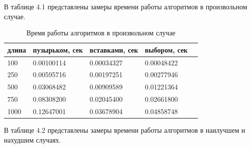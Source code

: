 \documentclass[12pt]{report}
\begin{document}
В таблице 4.1 представлены замеры времени работы алгоритмов в произвольном случае.

\begin{table}[H]
	\caption{\label{tabular:rand} Время работы алгоритмов в произвольном случае}
	\begin{center}
		
		\begin{tabular}{ | l | l | l | l | l | }
			\hline
			длина & пузырьком, сек & вставками, сек & выбором, сек\\
			\hline
			100 & 0.00100114 & 0.00034327 & 0.00048422 \\
			250 & 0.00595716 & 0.00197251 & 0.00277946 \\
			500 & 0.03068482 & 0.00909589 & 0.01221364 \\
			750 & 0.08308200 & 0.02045400 & 0.02661800 \\
			1000 & 0.12647001 &  0.03678904  & 0.04858748 \\
			\hline
		\end{tabular}
	\end{center}
\end{table} 

 В таблице 4.2 представлены замеры времени работы алгоритмов в наилучшем и нахудшим случаях.
\end{document}
